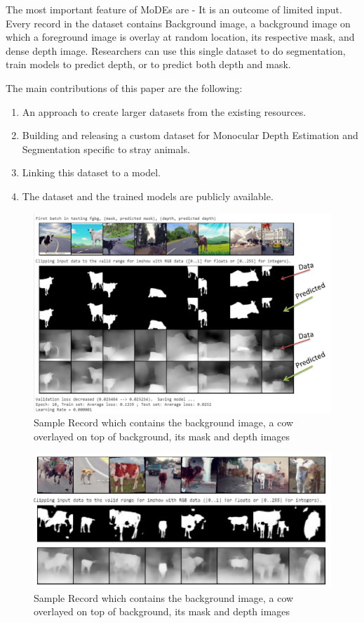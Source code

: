 \documentclass{article}
\begin{document}
The most important feature of MoDEs are -  It is an outcome of limited input. Every record in the dataset contains Background image, a background image on which a foreground image is overlay at random location, its respective mask, and dense depth image. Researchers can use this single dataset to do segmentation, train models to predict depth, or to predict both depth and mask. 

The main contributions of this paper are the following:
\begin{enumerate}
\item An approach to create larger datasets from the existing resources.
\item Building and releasing a custom dataset for Monocular Depth Estimation and Segmentation specific to stray animals.
\item Linking this dataset to a model.
\item The dataset and the trained models are publicly available.
\end{enumerate}

\begin{figure}[h!]
\centering
  \includegraphics[width=1\textwidth]{finalepoch.png}
  \caption{Sample Record which contains the background image, a cow overlayed on top of background, its mask and depth images}
  \label{fig:samplerecord}
\end{figure}


\begin{figure}[h!]
\centering
  \includegraphics[width=1\textwidth]{unseen.jpeg}
  \caption{Sample Record which contains the background image, a cow overlayed on top of background, its mask and depth images}
  \label{fig:samplerecord}
\end{figure}
\end{document}
